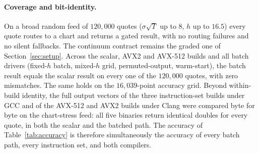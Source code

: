\documentclass[11pt]{article}
\begin{document}
\paragraph{Coverage and bit-identity.}
On a broad random feed of $120{,}000$ quotes ($\sigma\sqrt T$ up to $8$, $h$ up to $16.5$) every quote routes to a chart and returns a gated result, with no routing failures and no silent fallbacks. The continuum contract remains the graded one of Section~\ref{sec:setup}. Across the scalar, AVX2 and AVX-512 builds and all batch drivers (fixed-$h$ batch, mixed-$h$ grid, permuted-output, warm-start), the batch result equals the scalar result on every one of the $120{,}000$ quotes, with zero mismatches. The same holds on the $16{,}039$-point accuracy grid. Beyond within-build identity, the full output vectors of the three instruction-set builds under GCC and of the AVX-512 and AVX2 builds under Clang were compared byte for byte on the chart-stress feed: all five binaries return identical doubles for every quote, in both the scalar and the batched path. The accuracy of Table~\ref{tab:accuracy} is therefore simultaneously the accuracy of every batch path, every instruction set, and both compilers.
\end{document}
